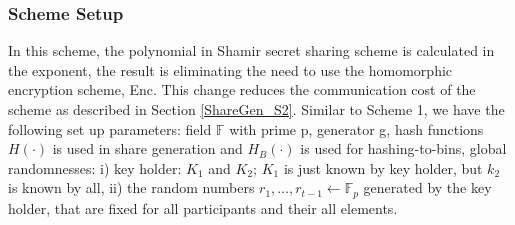 \subsubsection{Scheme Setup}
In this scheme, the polynomial in Shamir secret sharing scheme is calculated in the exponent, the result is eliminating the need to use the homomorphic encryption scheme, Enc. This change reduces the communication cost of the scheme as described in Section \ref{ShareGen_S2}. Similar to Scheme 1, we have the following set up parameters: field $\mathbb{F}$ with prime p, generator g, hash functions $H(\cdot)$ is used in share generation and $H_B(\cdot)$ is used for hashing-to-bins, global randomnesses: i) key holder: $K_1$ and $K_2$; $K_1$ is just known by key holder, but $k_2$ is known by all, ii) the random numbers $r_1, \dots, r_{t-1} \gets \mathbb{F}_p$ generated by the key holder, that are fixed for all participants and their all elements. 

